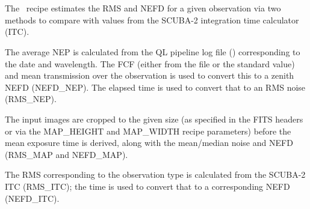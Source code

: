 \chapter{}
\label{app:checkrmsparams}

The \picard\ recipe  estimates the RMS
and NEFD for a given observation via two methods to compare with
values from the SCUBA-2 integration time calculator (ITC).

The average NEP is calculated from the QL pipeline log file
() corresponding to the date and wavelength. The FCF
(either from the file or the standard value) and mean transmission
over the observation is used to convert this to a zenith NEFD
(NEFD\_NEP). The elapsed time is used to convert that to an RMS noise
(RMS\_NEP).

The input images are cropped to the given size (as specified in the
FITS headers or via the MAP\_HEIGHT and MAP\_WIDTH recipe parameters)
before the mean exposure time is derived, along with the mean/median
noise and NEFD (RMS\_MAP and NEFD\_MAP).

The RMS corresponding to the observation type is calculated from the
SCUBA-2 ITC (RMS\_ITC); the time is used to convert that to a
corresponding NEFD (NEFD\_ITC).

